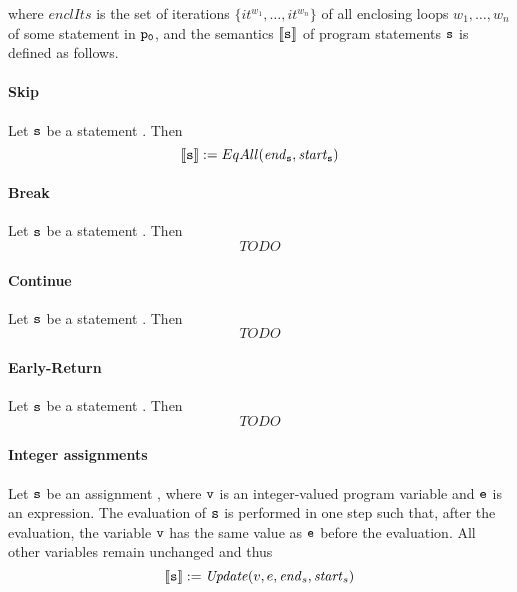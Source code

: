 
where $enclIts$ is the set of iterations $\{it^{w_1},\dots,
it^{w_n}\}$ of  all enclosing loops $w_1, \dots, w_n$ of some statement  in $\texttt{p$\mathtt{_{0}}$}$, and
the semantics $\llbracket \texttt{s} \rrbracket$ of program statements $\texttt{s}$ is defined as follows.

\paragraph{Skip}
Let $\texttt{s}$ be a statement . Then 
\begin{equation}\label{semantics_skip}
\llbracket \texttt{s}\rrbracket := EqAll(\mathit{end}_{\texttt{s}},\mathit{start}_{\texttt{s}})
\end{equation}

\paragraph{Break}
Let $\texttt{s}$ be a statement . Then 
\begin{equation}\label{semantics_break}
TODO
\end{equation}

\paragraph{Continue}
Let $\texttt{s}$ be a statement . Then 
\begin{equation}\label{semantics_continue}
TODO
\end{equation}

\paragraph{Early-Return}
Let $\texttt{s}$ be a statement . Then 
\begin{equation}\label{semantics_return}
TODO
\end{equation}

\paragraph{Integer assignments}
Let $\texttt{s}$ be an assignment , %
where $\texttt{v}$ is an integer-valued  program variable and
$\texttt{e}$ is an expression.
The evaluation of $\texttt{s}$ is performed in one step such that, after the evaluation, the variable $\texttt{v}$ has the same value as $\texttt{e}$ before the evaluation. 
All other variables remain unchanged and thus 
%
\begin{equation}\label{semantics_int_assign}
\llbracket \texttt{s}\rrbracket := \mathit{Update}(v,e,\mathit{end}_s,\mathit{start}_s)
\end{equation}

